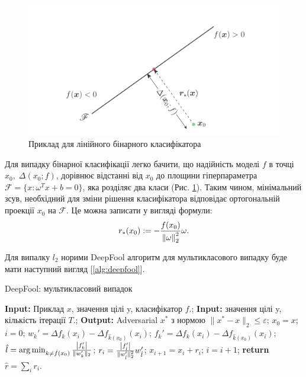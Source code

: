 \documentclass[a4paper,14pt]{extreport}
\renewcommand{\algorithmicrequire}{\textbf{Input: }}
\renewcommand{\algorithmicensure}{\textbf{Output: }}
\newcommand{\algorithmreturn}{\textbf{return }}
\newcommand{\tran}{^{T}}
\begin{document}
	\begin{figure}[h]
		\centering
		\includegraphics[width=\textwidth]{resources/deepfool.jpg}
		\caption{Приклад для лінійного бінарного класифікатора \cite{moosavidezfooli2015deepfool}}
		\label{fig:dfhyperline}
	\end{figure}

	Для випадку бінарної класифікації легко бачити, що надійність моделі $f$ в точці $ x_{0}, \; \Delta(x_{0}; f)$, дорівнює відстанні від $x_{0}$ до площини гіперпараметра $\mathscr{F} = \{ x: \omega\tran x + b = 0 \}$, яка розділяє два класи (Рис. \ref{fig:dfhyperline}). Таким чином, мінімальний зсув, необхідний для зміни рішення класифікатора відповідає ортогональній проекції $x_{0}$ на $\mathscr{F}$. Це можна записати у вигляді формули:
	\begin{align}
		r_{*}(x_{0}) := -\frac{f(x_{0})}{\norm{\omega}_{2}^{2}} \omega .
	\end{align}

	Для випалку $l_2$ норими DeepFool алгоритм для мультикласового випадку буде мати наступний вигляд [\ref{alg:deepfool}].

	\begin{algorithm}
		\caption{DeepFool: мультикласовий випадок}
		\label{alg:deepfool}
		\begin{algorithmic}[1]
			\State \algorithmicrequire{Приклад $x$, значення цілі y, класифікатор $f$.};
			\State \algorithmicrequire{значення цілі y, кількість ітерації $T$.};
			\State \algorithmicensure{ Adversarial $x^{*}$ з нормою $\|x^{*} - x\|_{2} \leq \varepsilon $};
			\State $x_0 = x$; $i = 0$; 
					\State $ w_{k}' = \Delta f_k(x_i) - \Delta f_{\hat{k}(x_0)} (x_i)$;
					\State $ f_{k}' = \Delta f_k(x_i) - \Delta f_{\hat{k}(x_0)} (x_i)$;
				\EndFor
				\State $\hat{l} = \arg \min_{k \neq \hat{f}(x_0)} \frac{\abs{f_{k}'}}{\|w_{k}'\|_2}$;
				\State $r_i = \frac{\abs{f_{\hat{l}}'}}{\|w_{\hat{l}}'\|_{2}^{2}} w_{\hat{l}}'$;
				\State $x_{i+1} = x_i + r_i$;
				\State $i = i + 1$;
			\EndWhile
			\State \algorithmreturn{$\hat{r} = \sum_{i} r_i $}.
		\end{algorithmic}
	\end{algorithm}
	
\end{document}
